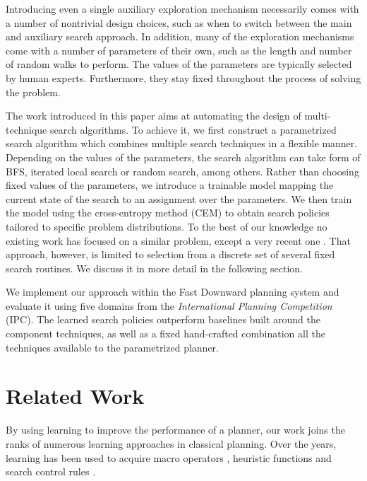 \documentclass[letterpaper]{article} %
\begin{document}
Introducing even a single auxiliary exploration mechanism necessarily comes with a number of nontrivial design choices, such as when to switch between the main and auxiliary search approach. In addition, many of the exploration mechanisms come with a number of parameters of their own, such as the length and number of random walks to perform. The values of the parameters are typically selected by human experts. Furthermore, they stay fixed throughout the process of solving the problem.

The work introduced in this paper aims at automating the design of multi-technique search algorithms. To achieve it, we first construct a parametrized search algorithm which combines multiple search techniques in a flexible manner. Depending on the values of the parameters, the search algorithm can take form of BFS, iterated local search or random search, among others. Rather than choosing fixed values of the parameters, we introduce a trainable model mapping the current state of the search to an assignment over the parameters. We then train the model using the cross-entropy method (CEM) to obtain search policies tailored to specific problem distributions. To the best of our knowledge no existing work has focused on a similar problem, except a very recent one \cite{Gomoluch2019}. That approach, however, is limited to selection from a discrete set of several fixed search routines. We discuss it in more detail in the following section.

We implement our approach within the Fast Downward planning system \cite{Helmert2006} and evaluate it using five domains from the \emph{International Planning Competition} (IPC). The learned search policies outperform baselines built around the component techniques, as well as a fixed hand-crafted combination all the techniques available to the parametrized planner.

\section{Related Work}

By using learning to improve the performance of a planner, our work joins the ranks of numerous learning approaches in classical planning. Over the years, learning has been used to acquire macro operators \cite{Fikes1972,Coles2007,Gerevini2009}, heuristic functions \cite{Yoon2008,Virseda2013,Garrett2016} and search control rules \cite{Leckie1998,Yoon2008}.
\end{document}
